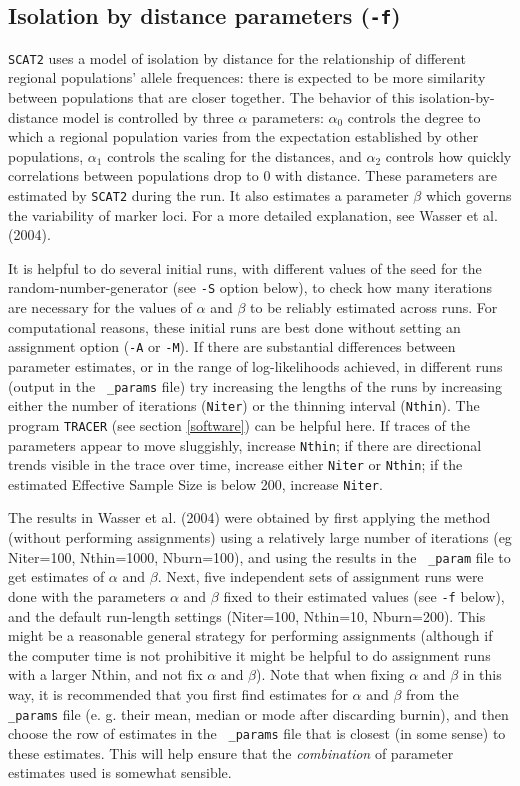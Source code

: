 \documentclass[10pt,titlepage,times,letterpaper]{article}
\def\SCAT{{\tt SCAT2} }
\begin{document}
\subsection{Isolation by distance parameters ({\tt -f})}

\SCAT uses a model of isolation by distance for the relationship of
different regional populations' allele frequences:  there is expected to
be more similarity between populations that are closer together.  The
behavior of this isolation-by-distance model is controlled by three
$\alpha$ parameters:  $\alpha_0$ controls the degree to which a regional
population varies from the expectation established by other populations,
$\alpha_1$ controls the scaling for the distances, and $\alpha_2$
controls how quickly correlations between populations drop to 0 with distance.
These parameters are estimated by \SCAT during the run.
It also estimates a parameter $\beta$ which governs the variability
of marker loci.  For a more detailed explanation, see Wasser et al. (2004).

It is helpful to do
several initial runs, with different values of the seed for the
random-number-generator (see {\tt -S} option below), to check how many
iterations are necessary for the values of $\alpha$ and $\beta$ to be
reliably estimated across runs. For computational reasons, these
initial runs are best done without setting an assignment option ({\tt -A}
or {\tt -M}).  If there are
substantial differences between parameter estimates, or in the range
of log-likelihoods achieved, in different runs (output in the {\tt
\_params} file) try increasing the lengths of the runs by increasing
either the number of iterations ({\tt Niter}) or the thinning interval
({\tt Nthin}).  The program {\tt TRACER} (see section \ref{software}) can be
helpful here.  If traces of the parameters appear to move sluggishly,
increase {\tt Nthin}; if there are directional trends visible in the
trace over time, increase either {\tt Niter} or {\tt Nthin}; if the
estimated Effective Sample Size is below 200, increase {\tt Niter}.

The results in Wasser et al. (2004) were obtained by 
first applying the method (without performing assignments)
using a relatively large number of iterations (eg
{Niter=100, Nthin=1000, Nburn=100}), and using the results in the {\tt
\_param} file to get estimates of $\alpha$ and $\beta$.  Next,
five independent sets of assignment runs were done with the parameters $\alpha$
and $\beta$ fixed to their estimated values (see {\tt -f} below), and
the default run-length settings (Niter=100, Nthin=10, Nburn=200). This
might be a reasonable general strategy for performing assignments
(although if the computer time is not prohibitive it might be helpful
to do assignment runs with a larger Nthin, and not fix $\alpha$ and
$\beta$). Note that when fixing $\alpha$ and $\beta$ in this way, it
is recommended that you first find estimates for $\alpha$ and $\beta$
from the {\tt \_params} file (e. g. their mean, median or mode after
discarding burnin), and then choose the row of estimates in the {\tt
\_params} file that is closest (in some sense) to these
estimates. This will help ensure that the {\it combination} of
parameter estimates used is somewhat sensible.
\end{document}
